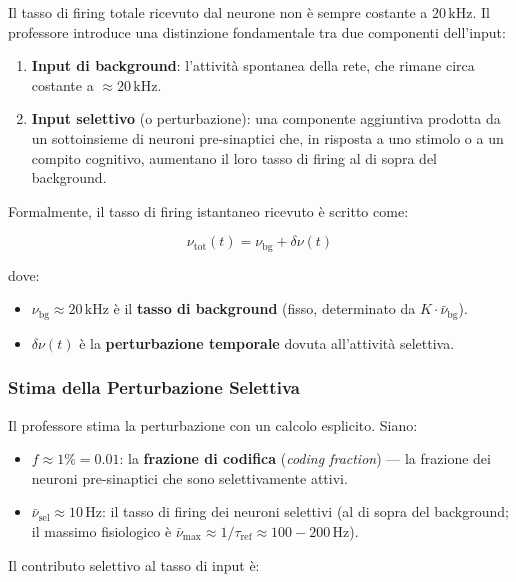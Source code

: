 Il tasso di firing totale ricevuto dal neurone non è sempre costante a $20\,\text{kHz}$. Il professore introduce una distinzione fondamentale tra due componenti dell'input:

\begin{enumerate}
    \item \textbf{Input di background}: l'attività spontanea della rete, che rimane circa costante a $\approx 20\,\text{kHz}$.
    \item \textbf{Input selettivo} (o perturbazione): una componente aggiuntiva prodotta da un sottoinsieme di neuroni pre-sinaptici che, in risposta a uno stimolo o a un compito cognitivo, aumentano il loro tasso di firing al di sopra del background.
\end{enumerate}

Formalmente, il tasso di firing istantaneo ricevuto è scritto come:

\begin{equation}
\nu_{\text{tot}}(t) = \nu_{\text{bg}} + \delta\nu(t)
\end{equation}

dove:
\begin{itemize}
    \item $\nu_{\text{bg}} \approx 20\,\text{kHz}$ è il \textbf{tasso di background} (fisso, determinato da $K \cdot \bar{\nu}_\text{bg}$).
    \item $\delta\nu(t)$ è la \textbf{perturbazione temporale} dovuta all'attività selettiva.
\end{itemize}

\subsubsection{Stima della Perturbazione Selettiva}

Il professore stima la perturbazione con un calcolo esplicito. Siano:
\begin{itemize}
    \item $f \approx 1\% = 0.01$: la \textbf{frazione di codifica} (\textit{coding fraction}) — la frazione dei neuroni pre-sinaptici che sono selettivamente attivi.
    \item $\bar{\nu}_{\text{sel}} \approx 10\,\text{Hz}$: il tasso di firing dei neuroni selettivi (al di sopra del background; il massimo fisiologico è $\bar{\nu}_{\text{max}} \approx 1/\tau_{\text{ref}} \approx 100-200\,\text{Hz}$).
\end{itemize}

Il contributo selettivo al tasso di input è:

